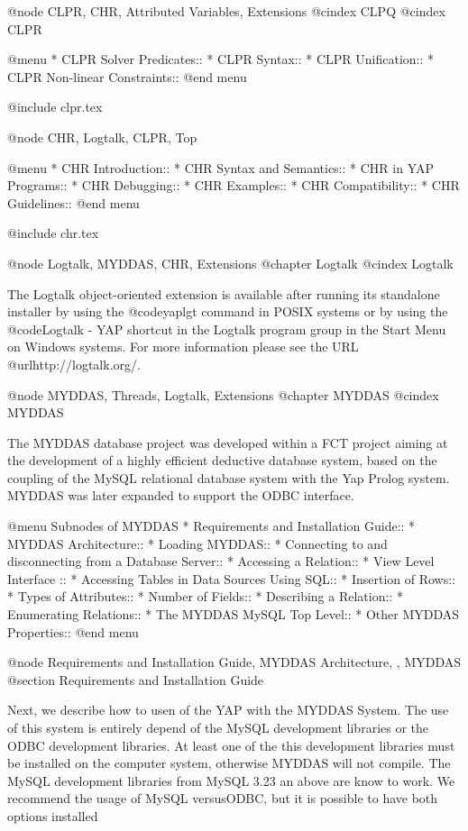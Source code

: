 {{{{{{{{@node CLPR, CHR, Attributed Variables, Extensions
@cindex CLPQ
@cindex CLPR

@menu
* CLPR Solver Predicates::
* CLPR Syntax::
* CLPR Unification::
* CLPR Non-linear Constraints::               
@end menu

@include clpr.tex

@node CHR, Logtalk, CLPR, Top

@menu
* CHR Introduction::            
* CHR Syntax and Semantics::
* CHR in YAP Programs::
* CHR Debugging::               
* CHR Examples::       
* CHR Compatibility::     
* CHR Guidelines::  
@end menu

@include chr.tex

@node Logtalk, MYDDAS, CHR, Extensions
@chapter Logtalk
@cindex Logtalk

The Logtalk object-oriented extension is available after running its 
standalone installer by using the @code{yaplgt} command in POSIX 
systems or by using the @code{Logtalk - YAP} shortcut in the Logtalk 
program group in the Start Menu on Windows systems. For more information 
please see the URL @url{http://logtalk.org/}.

@node MYDDAS, Threads, Logtalk, Extensions
@chapter MYDDAS
@cindex MYDDAS

The MYDDAS database project was developed within a FCT project aiming at
the development of a highly efficient deductive database system, based
on the coupling of the MySQL relational database system with the Yap
Prolog system. MYDDAS was later expanded to support the ODBC interface.

@menu
Subnodes of MYDDAS
* Requirements and Installation Guide:: 
* MYDDAS Architecture:: 
* Loading MYDDAS:: 
* Connecting to and disconnecting from a Database Server:: 
* Accessing a Relation:: 
* View Level Interface :: 
* Accessing Tables in Data Sources Using SQL:: 
* Insertion of Rows:: 
* Types of Attributes:: 
* Number of Fields:: 
* Describing a Relation:: 
* Enumerating Relations:: 
* The MYDDAS MySQL Top Level:: 
* Other MYDDAS Properties:: 
@end menu

@node Requirements and Installation Guide, MYDDAS Architecture, , MYDDAS
@section Requirements and Installation Guide

Next, we describe how to usen of the YAP with the MYDDAS System.  The
use of this system is entirely depend of the MySQL development libraries
or the ODBC development libraries. At least one of the this development
libraries must be installed on the computer system, otherwise MYDDAS
will not compile. The MySQL development libraries from MySQL 3.23 an
above are know to work. We recommend the usage of MySQL versusODBC,
but it is possible to have both options installed

}}}}}}}}
